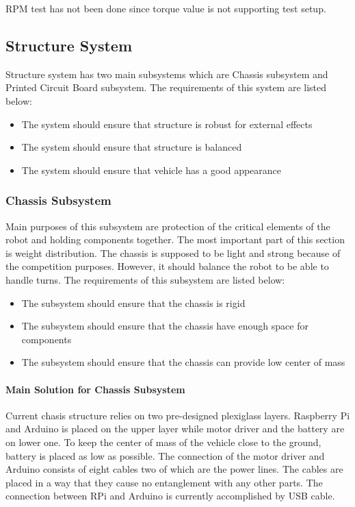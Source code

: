 \documentclass[a4paper,12pt]{article}
\begin{document}
	RPM test has not been done since torque value is not supporting test setup.
	\subsection{Structure System}
	
	Structure system has two main subsystems which are Chassis subsystem and Printed Circuit Board subsystem. The requirements of this system are listed below:
	\begin{itemize}
		\item The system should	ensure that structure is robust for external effects 
		\item The system should	ensure that structure is balanced
		\item The system should ensure that vehicle has a good appearance
	\end{itemize}
	
	
	
	\subsubsection{Chassis Subsystem}
	Main purposes of this subsystem are protection of the critical elements of the robot and holding components together. The most important part of this section is weight distribution. The chassis is supposed to be light and strong because of the competition purposes. However, it should balance the robot to be able to handle turns. The requirements of this subsystem are listed below:
	\begin{itemize}
		\item The subsystem should ensure that the chassis is rigid 
		\item The subsystem should ensure that the chassis have enough space for components
		\item The subsystem should ensure that the chassis can provide low center of mass 
	\end{itemize}
	
	\paragraph{Main Solution for Chassis Subsystem}
	
	Current chasis structure relies on two pre-designed plexiglass layers. Raspberry Pi and Arduino is placed on the upper layer while motor driver and the battery are on lower one. To keep the center of mass of the vehicle close to the ground, battery is placed as low as possible. The connection of the motor driver and Arduino consists of eight cables two of which are the power lines. The cables are placed in a way that they cause no entanglement with any other parts. The connection between RPi and Arduino is currently accomplished by USB cable. \\
	
\end{document}
